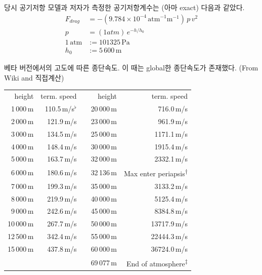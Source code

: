 \documentclass[9pt]{amsbook}
\newcommand{\ttuna}{\textsuperscript{$\dagger$}} %
\newcommand{\ttsecu}{\textsuperscript{$\ddagger$}} %
\begin{document}
당시 공기저항 모델과 저자가 측정한 공기저항계수는 (아마 exact) 다음과 같았다.
\begin{align}
F_{drag}&=-(9.784\times 10^{-4}\, \mathrm{atm}^{-1}\mathrm{m}^{-1})\, p\, v^2
\\p&=(1 atm)\,e^{-h/h_0}
\\1\,\mathrm{atm} &:= 101325\,\mathrm{Pa}
\\h_0&:= 5\,600\,\mathrm{m}
\end{align}
\begin{center}
\begin{threeparttable}
	\caption{베타 버전에서의 고도에 따른 종단속도. 이 때는 global한 종단속도가 존재했다. (From Wiki and 직접계산)}
		\begin{tabular}{|r|r|r|r|r|}
			\cline{1-2}\cline{4-5}
			height& term. speed&&height& term. speed
			\\\cline{1-2}\cline{4-5}
			1\,000\,m&110.5\,m/s$^\flat$ && 20\,000\,m&716.0\,m/s
			\\\cline{1-2}\cline{4-5}
			2\,000\,m&121.9\,m/s && 23\,000\,{m}&961.9\,m/s
			\\\cline{1-2}\cline{4-5}
			3\,000\,m&134.5\,m/s && 25\,000\,{m}&1171.1\,m/s
			\\\cline{1-2}\cline{4-5}
			4\,000\,m&148.4\,m/s && 30\,000\,{m}&1915.4\,m/s
			\\\cline{1-2}\cline{4-5}
			5\,000\,m&163.7\,m/s && 32\,000\,{m}&2332.1\,m/s
			\\\cline{1-2}\cline{4-5}
			6\,000\,{m}&180.6\,m/s && 32\,136\,{m}&Max enter periapsis\ttuna
			\\\cline{1-2}\cline{4-5}
			7\,000\,{m}&199.3\,m/s && 35\,000\,{m}&3133.2\,m/s
			\\\cline{1-2}\cline{4-5}
			8\,000\,{m}&219.9\,m/s && 40\,000\,{m}&5125.4\,m/s
			\\\cline{1-2}\cline{4-5}
			9\,000\,{m}&242.6\,m/s && 45\,000\,{m}&8384.8\,m/s
			\\\cline{1-2}\cline{4-5}
			10\,000\,{m}&267.7\,m/s && 50\,000\,{m}&13717.9\,m/s
			\\\cline{1-2}\cline{4-5}
			12\,500\,{m}&342.4\,m/s && 55\,000\,{m}&22444.3\,m/s
			\\\cline{1-2}\cline{4-5}
			15\,000\,{m}&437.8\,m/s && 60\,000\,{m}&36724.0\,m/s
			\\\cline{1-2}\cline{4-5}
			\multicolumn{3}{r|}{}&69\,077\,{m}&End of atmosphere\ttsecu
			\\\cline{4-5}
		\end{tabular}
	\begin{tablenotes}

\end{tablenotes}
\end{threeparttable}
\end{center}
\end{document}
